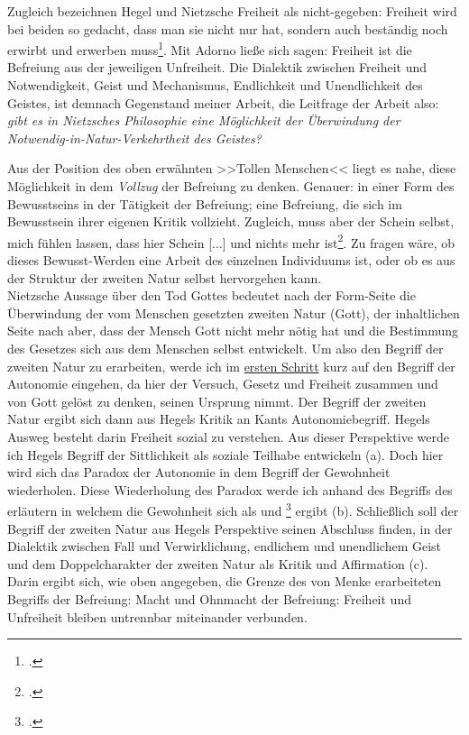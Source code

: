 \documentclass[12pt, a4paper, openany]{report}
\begin{document}
Zugleich bezeichnen Hegel und Nietzsche Freiheit als nicht-gegeben: 
Freiheit wird bei beiden so gedacht, dass man sie \glqq nicht nur hat, sondern auch beständig  noch erwirbt und erwerben muss\grqq\footcite[][636]{nietzsche_morgenrote_1999}. 
Mit Adorno ließe sich sagen: Freiheit ist die Befreiung aus der jeweiligen Unfreiheit.
Die Dialektik zwischen Freiheit und Notwendigkeit, Geist und Mechanismus, Endlichkeit und Unendlichkeit des Geistes, ist demnach Gegenstand meiner Arbeit, 
die Leitfrage der Arbeit also: \textit{gibt es in Nietzsches Philosophie eine Möglichkeit der Überwindung der Notwendig-in-Natur-Verkehrtheit des Geistes?}

Aus der Position des oben erwähnten >>Tollen Menschen<< liegt es nahe, diese Möglichkeit in dem \textit{Vollzug} der Befreiung zu denken. 
Genauer: in einer Form des Bewusstseins in der Tätigkeit der Befreiung; 
eine Befreiung, die sich im Bewusstsein ihrer eigenen Kritik vollzieht.
Zugleich, muss aber der Schein selbst, \glqq mich fühlen lassen, dass hier Schein [...] und nichts mehr ist\grqq\footcite[][417.]{nietzsche_morgenrote_1999}.
Zu fragen wäre, ob dieses Bewusst-Werden eine Arbeit des einzelnen Individuums ist, oder ob es aus der Struktur der zweiten Natur selbst hervorgehen kann.\\

Nietzsche Aussage über den Tod Gottes bedeutet nach der Form-Seite die Überwindung der vom Menschen gesetzten zweiten Natur (Gott), der inhaltlichen Seite nach aber, dass der Mensch Gott nicht mehr nötig hat und die Bestimmung des Gesetzes sich aus dem Menschen selbst entwickelt. 
Um also den Begriff der zweiten Natur zu erarbeiten, werde ich im \hyperref[abschnitt_1]{ersten Schritt} kurz auf den Begriff der Autonomie eingehen, da hier der Versuch, Gesetz und Freiheit zusammen und von Gott gelöst zu denken, seinen Ursprung nimmt. 
Der Begriff der zweiten Natur ergibt sich dann aus Hegels Kritik an Kants Autonomiebegriff.
Hegels Ausweg besteht darin Freiheit sozial zu verstehen.
Aus dieser Perspektive werde ich Hegels Begriff der Sittlichkeit als soziale Teilhabe entwickeln (a).
Doch hier wird sich das Paradox der Autonomie in dem Begriff der Gewohnheit wiederholen.
Diese Wiederholung des Paradox werde ich anhand des Begriffs des  erläutern in welchem die Gewohnheit sich als  und \footcite[Vgl.][145]{menke_autonomie_2018} ergibt (b).
Schließlich soll der Begriff der zweiten Natur aus Hegels Perspektive seinen Abschluss finden, in der Dialektik zwischen Fall und Verwirklichung, endlichem und unendlichem Geist und dem Doppelcharakter der zweiten Natur als Kritik und Affirmation (c).
Darin ergibt sich, wie oben angegeben, die Grenze des von Menke erarbeiteten Begriffs der Befreiung:
Macht und Ohnmacht der Befreiung: Freiheit und Unfreiheit bleiben untrennbar miteinander verbunden.
\end{document}
